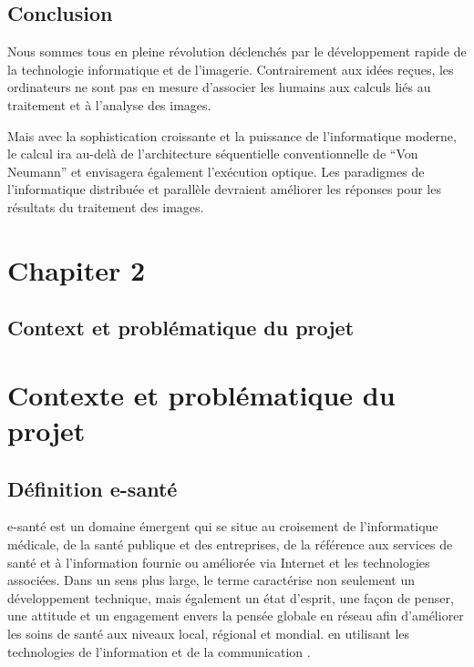 \documentclass[12pt]{article}
\begin{document}
\subsection{Conclusion}
Nous sommes tous en pleine révolution déclenchés par le développement rapide de la technologie informatique et de l'imagerie. Contrairement aux idées reçues, les ordinateurs ne sont pas en mesure d’associer les humains aux calculs liés au traitement et à l’analyse des images.

Mais avec la sophistication croissante et la puissance de l'informatique moderne, le calcul ira au-delà de l'architecture séquentielle conventionnelle de “Von Neumann” et envisagera également l'exécution optique. Les paradigmes de l'informatique distribuée et parallèle devraient améliorer les réponses pour les résultats du traitement des images.
\newpage
\section*{\Huge{Chapiter 2}}
\subsection*{\huge{Context et problématique du projet}}
\newpage
\section{Contexte et problématique du projet}
\subsection{Définition e-santé}
e-santé est un domaine émergent qui se situe au croisement de l'informatique médicale, de la santé publique et des entreprises, de la référence aux services de santé et à l'information fournie ou améliorée via Internet et les technologies associées. Dans un sens plus large, le terme caractérise non seulement un développement technique, mais également un état d'esprit, une façon de penser, une attitude et un engagement envers la pensée globale en réseau afin d'améliorer les soins de santé aux niveaux local, régional et mondial. en utilisant les technologies de l'information et de la communication \cite{26}.
\end{document}
